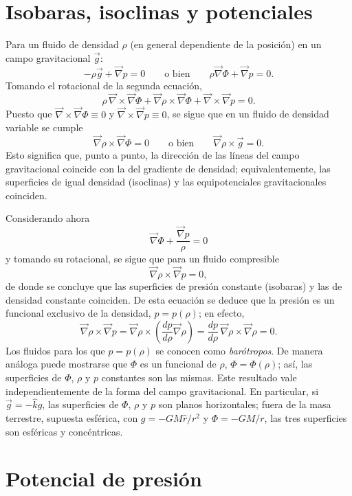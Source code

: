 \section{Isobaras, isoclinas y potenciales}

Para un fluido de densidad $\rho$ (en general dependiente de la posición) en un campo gravitacional $\vec{g}$:
$$ -\rho\vec{g} + \vec{\nabla}p = 0 \qquad \text{o bien} \qquad \rho\vec{\nabla}\Phi + \vec{\nabla}p = 0. $$
Tomando el rotacional de la segunda ecuación,
$$ \rho\,\vec{\nabla}\times\vec{\nabla}\Phi + \vec{\nabla}\rho\times\vec{\nabla}\Phi + \vec{\nabla}\times\vec{\nabla}p = 0. $$
Puesto que $\vec{\nabla}\times\vec{\nabla}\Phi \equiv 0$ y $\vec{\nabla}\times\vec{\nabla}p \equiv 0$, se sigue que en un fluido de densidad variable se cumple
$$ \vec{\nabla}\rho\times\vec{\nabla}\Phi = 0 \qquad \text{o bien} \qquad \vec{\nabla}\rho\times\vec{g} = 0. $$
Esto significa que, punto a punto, la dirección de las líneas del campo gravitacional coincide con la del gradiente de densidad; equivalentemente, las superficies de igual densidad (isoclinas) y las equipotenciales gravitacionales coinciden.

Considerando ahora
$$ \vec{\nabla}\Phi + \frac{\vec{\nabla}p}{\rho} = 0 $$
y tomando su rotacional, se sigue que para un fluido compresible
$$ \vec{\nabla}\rho\times\vec{\nabla}p = 0, $$
de donde se concluye que las superficies de presión constante (isobaras) y las de densidad constante coinciden. De esta ecuación se deduce que la presión es un funcional exclusivo de la densidad, $p = p(\rho)$; en efecto,
$$ \vec{\nabla}\rho\times\vec{\nabla}p = \vec{\nabla}\rho\times\left(\frac{dp}{d\rho}\vec{\nabla}\rho\right) = \frac{dp}{d\rho}\,\vec{\nabla}\rho\times\vec{\nabla}\rho = 0. $$
Los fluidos para los que $p = p(\rho)$ se conocen como \emph{barótropos}. De manera análoga puede mostrarse que $\Phi$ es un funcional de $\rho$, $\Phi = \Phi(\rho)$; así, las superficies de $\Phi$, $\rho$ y $p$ constantes son las mismas. Este resultado vale independientemente de la forma del campo gravitacional. En particular, si $\vec{g} = -\hat{k}g$, las superficies de $\Phi$, $\rho$ y $p$ son planos horizontales; fuera de la masa terrestre, supuesta esférica, con $g = -GM\hat{r}/r^2$ y $\Phi = -GM/r$, las tres superficies son esféricas y concéntricas.

\figuraSuperficiesHidrostaticas

\section{Potencial de presión}

